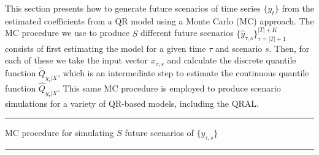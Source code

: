 This section presents how to generate future scenarios of time series $\{y_t\}$ from the estimated coefficients from a QR model using a Monte Carlo (MC) approach. 
The MC procedure  we use to produce $S$ different future scenarios $\{ \hat{y}_{\tau,s} \}_{\tau=|T|+1}^{|T|+K}$ consists of first estimating the model for a given time $\tau$ and scenario $s$. Then, for each of these we take the input vector $x_{\tau,s}$ and calculate the discrete quantile function $\tilde{Q}_{y_{\tau}|X}$, which is an intermediate step to estimate the continuous quantile function $\hat{Q}_{y_{\tau}|X}$. 
This same MC procedure is employed to produce scenario simulations for a variety of QR-based models, including the QRAL.

\noindent\rule{\columnwidth}{1pt}

MC procedure for simulating $S$ future scenarios of $\{y_{\tau,s}\}$

\noindent\rule{\columnwidth}{1pt}

